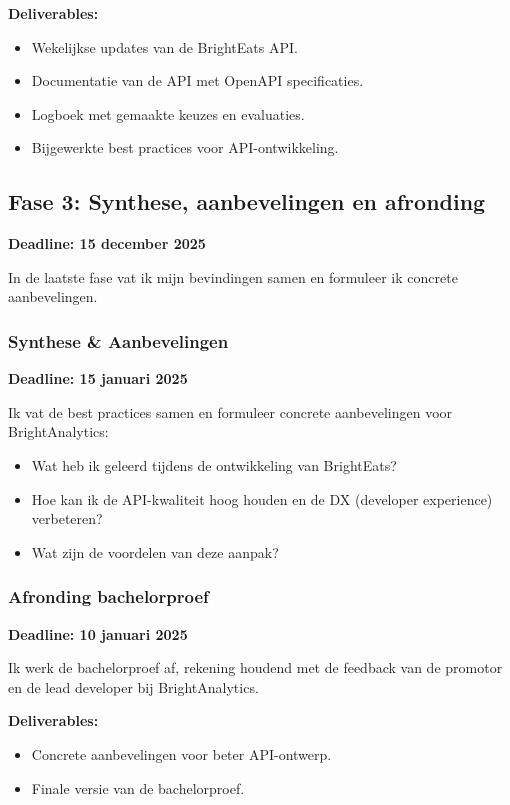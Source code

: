 \textbf{Deliverables:}

\begin{itemize}
  \item Wekelijkse updates van de BrightEats API.
  \item Documentatie van de API met OpenAPI specificaties.
  \item Logboek met gemaakte keuzes en evaluaties.
  \item Bijgewerkte best practices voor API-ontwikkeling.
\end{itemize}

\subsection{Fase 3: Synthese, aanbevelingen en afronding}

\textbf{Deadline: 15 december 2025}

\bigskip
In de laatste fase vat ik mijn bevindingen samen en formuleer ik concrete aanbevelingen.

\subsubsection{Synthese \& Aanbevelingen}

\textbf{Deadline: 15 januari 2025}

\bigskip
Ik vat de best practices samen en formuleer concrete aanbevelingen voor BrightAnalytics:

\begin{itemize}
  \item Wat heb ik geleerd tijdens de ontwikkeling van BrightEats?
  \item Hoe kan ik de API-kwaliteit hoog houden en de DX (developer experience) verbeteren?
  \item Wat zijn de voordelen van deze aanpak?
\end{itemize}

\subsubsection{Afronding bachelorproef}

\textbf{Deadline: 10 januari 2025}

\bigskip
Ik werk de bachelorproef af, rekening houdend met de feedback van de promotor en de lead developer bij BrightAnalytics.

\textbf{Deliverables:}

\begin{itemize}
  \item Concrete aanbevelingen voor beter API-ontwerp.
  \item Finale versie van de bachelorproef.
\end{itemize}

